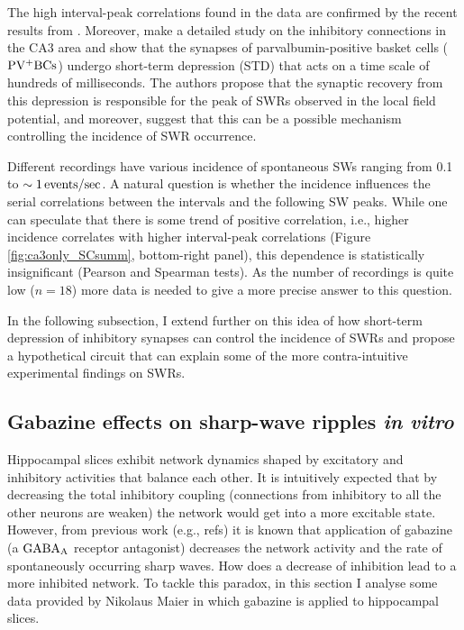     The high interval-peak correlations found in the data are confirmed by the
    recent results from \citep{Kohus2016}. Moreover, \citep{Kohus2016} make a
    detailed study on the inhibitory connections in the CA3 area and show that
    the synapses of parvalbumin-positive basket cells ($\rm PV^+BCs$) undergo
    short-term depression (STD) that acts on a time scale of hundreds of
    milliseconds. The authors propose that the synaptic recovery from this
    depression is responsible for the peak of SWRs observed in the local field
    potential, and moreover, suggest that this can be a possible mechanism
    controlling the incidence of SWR occurrence.
    
    Different recordings have various incidence of spontaneous SWs ranging from
    0.1 to $\sim 1 \,\rm events/sec$. A natural question is whether the
    incidence influences the serial correlations between the intervals and the
    following SW peaks. While one can speculate that there is some trend of
    positive correlation, i.e., higher incidence correlates with higher
    interval-peak correlations (Figure \ref{fig:ca3only_SCsumm}, bottom-right
    panel), this dependence is statistically insignificant (Pearson and
    Spearman tests). As the number of recordings is quite low ($n=18$) more
    data is needed to give a more precise answer to this question.
    
    In the following subsection, I extend further on this idea of how
    short-term depression of inhibitory synapses can control the incidence of
    SWRs and propose a hypothetical circuit that can explain some of the more
    contra-intuitive experimental findings on SWRs.

  \subsection{Gabazine effects on sharp-wave ripples {\textit {in vitro}} }

    Hippocampal slices exhibit network dynamics shaped by excitatory and
    inhibitory activities that balance each other. It is intuitively expected
    that by decreasing the total inhibitory coupling (connections from
    inhibitory to all the other neurons are weaken) the network would get into
    a more excitable state. However, from previous work (e.g., refs) it is
    known that application of gabazine (a $\rm GABA_A$ receptor antagonist)
    decreases the network activity and the rate of spontaneously occurring
    sharp waves. How does a decrease of inhibition lead to a more inhibited
    network. To tackle this paradox, in this section I analyse some data
    provided by Nikolaus Maier in which gabazine is applied to hippocampal
    slices.
    
